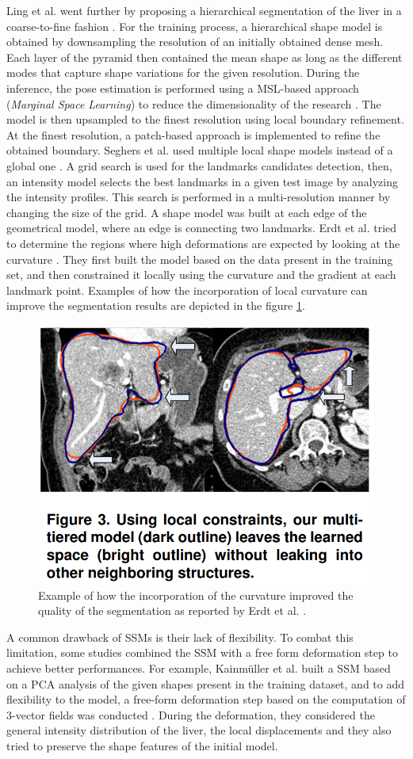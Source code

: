 \documentclass[]{article}
\begin{document}
	
	Ling et al. went further by proposing a hierarchical segmentation of
	the liver in a coarse-to-fine fashion \cite{Ling2008}. For the training process, a
	hierarchical shape model is obtained by downsampling the resolution of
	an initially obtained dense mesh. Each layer of the pyramid then
	contained the mean shape as long as the different modes that capture
	shape variations for the given resolution. During the inference, the
	pose estimation is performed using a MSL-based  approach (\emph{Marginal Space Learning}) to reduce the
	dimensionality of the research \cite{Zheng2007}. The model is then upsampled to the
	finest resolution using local boundary refinement. At the finest
	resolution, a patch-based approach is implemented to refine the obtained
	boundary.
	Seghers et al. used multiple local shape models instead of a global one \cite{Seghers2007}.
	A grid search is used for the landmarks candidates detection, then, an
	intensity model selects the best landmarks in a given test image by
	analyzing the intensity profiles. This search is performed in a
	multi-resolution manner by changing the size of the grid. A shape model
	was built at each edge of the geometrical model, where an edge is
	connecting two landmarks.
	Erdt et al. tried to determine the regions where high deformations
	are expected by looking at the curvature \cite{Erdt2010}. They first built the model
	based on the data present in the training set, and then constrained it
	locally using the curvature and the gradient at each landmark point.
	Examples of how the incorporation of local curvature can improve the
	segmentation results are depicted in the figure \ref{Erdt2010_Fig3}.
	
	\begin{figure}[th!]
		\centering
		\includegraphics[width=0.4\linewidth]{images/image33}
		\caption{Example of how the incorporation of the curvature improved the quality of the segmentation as reported by Erdt et al. \cite{Erdt2010}.}
		\label{Erdt2010_Fig3}
	\end{figure}
	
	
	A common drawback of SSMs is their lack of flexibility. To combat this
	limitation, some studies combined the SSM with a free form deformation
	step to achieve better performances. For example, Kainmüller et al. built a SSM based on a PCA analysis of the given shapes
	present in the training dataset, and to add flexibility to the model, a
	free-form deformation step based on the computation of 3-vector fields
	was conducted \cite{Kainmueller2007}. During the deformation, they considered the general
	intensity distribution of the liver, the local displacements and they
	also tried to preserve the shape features of the initial model.
	
\end{document}
